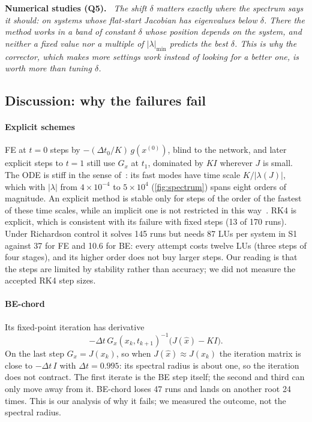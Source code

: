 \documentclass[sigconf,nonacm]{acmart}
\newcommand{\xo}{x^{(0)}}
\newenvironment{finding}[1]{\par\smallskip\noindent\textbf{#1}\itshape\ }{\par\smallskip}
\begin{document}
\begin{finding}{Numerical studies (Q5).}
The shift $\delta$ matters exactly where the spectrum says it should: on systems whose flat-start Jacobian
has eigenvalues below $\delta$. There the method works in a band of constant $\delta$ whose position depends
on the system, and neither a fixed value nor a multiple of $|\lambda|_{\min}$ predicts the best $\delta$.
This is why the corrector, which makes more settings work instead of looking for a better one, is worth more
than tuning $\delta$.
\end{finding}

\subsection{Discussion: why the failures fail}\label{sec:failure}
\paragraph{Explicit schemes} FE at $t=0$ steps by $-(\Delta t_0/K)\,g(\xo)$, blind to the network, and
later explicit steps to $t=1$ still use $G_x$ at $t_1$, dominated by $KI$ wherever $J$ is small. The ODE is
stiff in the sense of~\cite{hairer1996}: its fast modes have time scale $K/|\lambda(J)|$, which with
$|\lambda|$ from $4\times10^{-4}$ to $5\times10^{4}$ (\cref{fig:spectrum}) spans eight orders of magnitude.
An explicit method is stable only for steps of the order of the fastest of these time scales, while an
implicit one is not restricted in this way~\cite{hairer1996}. RK4 is explicit, which is consistent with its
failure with fixed steps (13 of 170 runs). Under Richardson control it solves 145 runs but needs 87 LUs per
system in S1 against 37 for FE and 10.6 for BE: every attempt costs twelve LUs (three steps of four stages),
and its higher order does not buy larger steps. Our reading is that the steps are limited by stability rather
than accuracy; we did not measure the accepted RK4 step sizes.

\paragraph{BE-chord} Its fixed-point iteration has derivative
\[
  -\Delta t\,G_x(x_k,t_{k+1})^{-1}\bigl(J(\hat x)-KI\bigr).
\]
On the last step $G_x=J(x_k)$, so when $J(\hat x)\approx J(x_k)$ the iteration matrix is close to
$-\Delta t\,I$ with $\Delta t=0.995$: its spectral radius is about one, so the iteration does not contract.
The first iterate is the BE step itself; the second and third can only move away from it. BE-chord loses 47
runs and lands on another root 24 times. This is our analysis of why it fails; we measured the outcome, not
the spectral radius.
\end{document}
